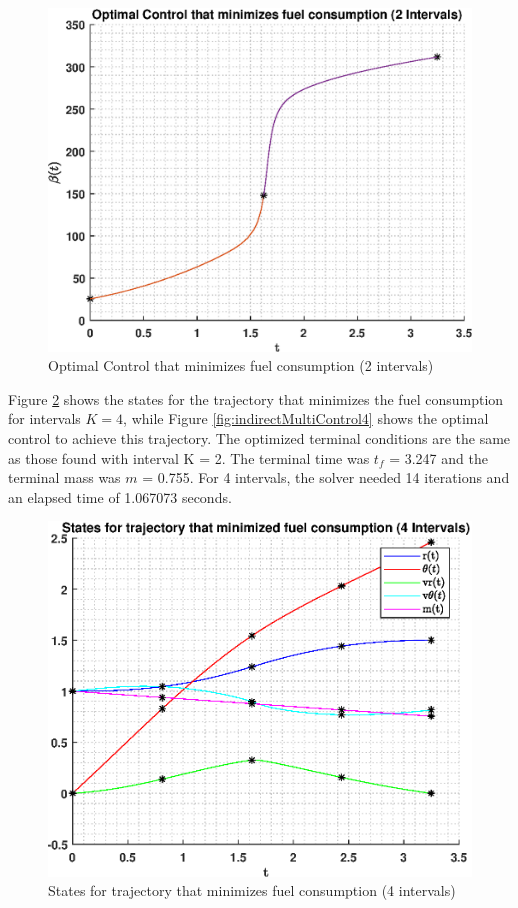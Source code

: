 \documentclass[]{article}
\begin{document}
\begin{figure}
	\centering
	\includegraphics[scale=0.75]{indirectMultiControl.eps}
	\caption{Optimal Control that minimizes fuel consumption (2 intervals)}
	\label{fig:indirectMultiControl}
\end{figure}
\vspace{2mm}\newline 
Figure \ref{fig:indirectMultiStates4} shows the states for the trajectory that minimizes the fuel consumption for intervals \(K = 4\), while Figure \ref{fig:indirectMultiControl4} shows the optimal control to achieve this trajectory. The optimized terminal conditions are the same as those found with interval K = 2. The terminal time was \(t_f\) = 3.247 and the terminal mass was \(m\) = 0.755. For 4 intervals, the solver needed 14 iterations and an elapsed time of 1.067073 seconds.
\begin{figure}
	\centering
	\includegraphics[scale=0.75]{indirectMultiStates4.eps}
	\caption{States for trajectory that minimizes fuel consumption (4 intervals)}
	\label{fig:indirectMultiStates4}
\end{figure}
\end{document}

